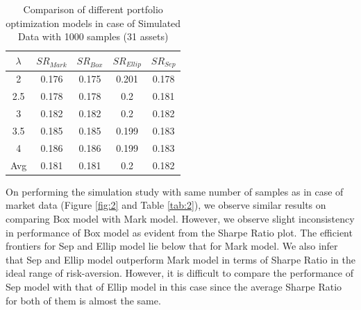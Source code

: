 \begin{table}[!h]
    \centering
    \captionsetup{justification=centering}
   \begin{tabular}{||c|c|c|c|c||}
   \hline
  
  
  $\lambda$ & $SR_{Mark}$ & $SR_{Box}$ & $SR_{Ellip}$ & $SR_{Sep}$ \\
  
  \hline
  2 & 0.176 & 0.175 & 0.201 & 0.178 \\
  2.5 & 0.178 & 0.178 & 0.2 & 0.181 \\
  3 & 0.182 & 0.182 & 0.2 & 0.182 \\
  3.5 & 0.185 & 0.185 & 0.199 & 0.183 \\
  4 & 0.186 & 0.186 & 0.199 & 0.183 \\
  \hline
  Avg & 0.181 & 0.181 & 0.2 & 0.182 \\
  \hline

\end{tabular}
    \caption{Comparison of different portfolio optimization models in case of Simulated Data with 1000 samples (31 assets)}
    \label{tab:1}
\end{table}

On performing the simulation study with same number of samples as in case of market data (Figure \ref{fig:2} and Table \ref{tab:2}), we observe similar results on comparing Box model with Mark model. However, we observe slight inconsistency in performance of Box model as evident from the Sharpe Ratio plot. The efficient frontiers for Sep and Ellip model lie below that for Mark model. We also infer that Sep and Ellip model outperform Mark model in terms of Sharpe Ratio in the ideal range of risk-aversion. However, it is difficult to compare the performance of Sep model with that of Ellip model in this case since the average Sharpe Ratio for both of them is almost the same.

